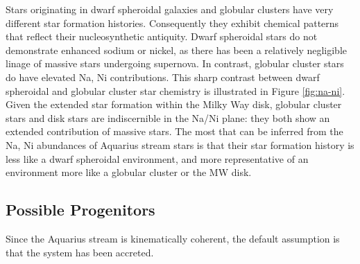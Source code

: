\documentclass{emulateapj}
\begin{document}
Stars originating in dwarf spheroidal galaxies and globular clusters have very different star formation histories. Consequently they exhibit chemical patterns that reflect their nucleosynthetic antiquity. Dwarf spheroidal stars do not demonstrate enhanced sodium or nickel, as there has been a relatively negligible linage of massive stars undergoing supernova. In contrast, globular cluster stars do have elevated Na, Ni contributions. This sharp contrast between dwarf spheroidal and globular cluster star chemistry is illustrated in Figure \ref{fig:na-ni}. Given the extended star formation within the Milky Way disk, globular cluster stars and disk stars are indiscernible in the Na/Ni plane: they both show an extended contribution of massive stars. The most that can be inferred from the Na, Ni abundances of Aquarius stream stars is that their star formation history is less like a dwarf spheroidal environment, and more representative of an environment more like a globular cluster or the MW disk. 



\subsection{Possible Progenitors}

Since the Aquarius stream is kinematically coherent, the default assumption is that the system has been accreted.








\end{document}
